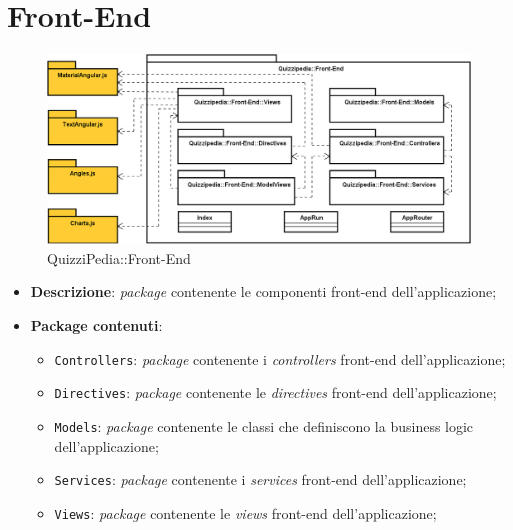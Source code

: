 \newpage
\section{Front-End}
\label{QuizziPedia::Front-End}
\begin{figure}[ht]
	\centering
	\includegraphics[scale=0.35]{UML/Package/QuizziPedia_Front-end.png}
	\caption{QuizziPedia::Front-End}
\end{figure}
\FloatBarrier
\begin{itemize}
	\item \textbf{Descrizione}: \textit{package} contenente le componenti front-end dell'applicazione;
	\item \textbf{Package contenuti}:
	\begin{itemize}
		\item \texttt{Controllers}: \textit{package} contenente i \textit{controllers} front-end dell'applicazione;
		\item \texttt{Directives}: \textit{package} contenente le \textit{directives} front-end dell'applicazione;
		\item \texttt{Models}: \textit{package} contenente le classi che definiscono la business logic dell'applicazione;
		\item \texttt{Services}: \textit{package} contenente i \textit{services} front-end dell'applicazione;
		\item \texttt{Views}: \textit{package} contenente le \textit{views} front-end dell'applicazione;
	\end{itemize}
\end{itemize}


